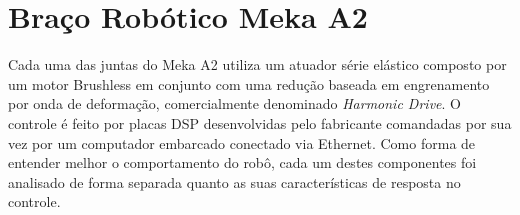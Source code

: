 








\section{Braço Robótico Meka A2}

Cada uma das juntas do Meka A2 utiliza um atuador série elástico composto por um motor Brushless em conjunto com uma redução baseada em engrenamento por onda de deformação, comercialmente denominado \textit{Harmonic Drive}. O controle é feito por placas DSP desenvolvidas pelo fabricante comandadas por sua vez por um computador embarcado conectado via Ethernet. Como forma de entender melhor o comportamento do robô, cada um destes componentes foi analisado de forma separada quanto as suas características de resposta no controle.

